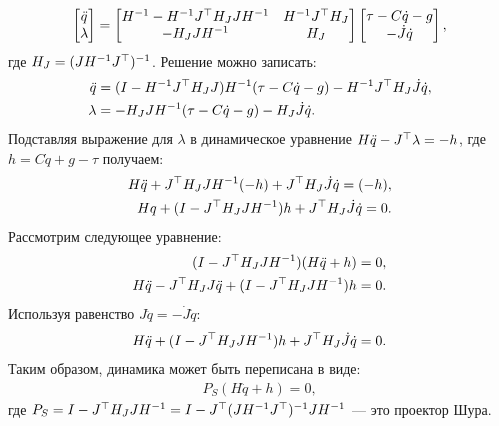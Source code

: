 \begin{equation}
	\begin{bmatrix}
		\ddot{{q}} \\
		\lambda
	\end{bmatrix}
	=
	\begin{bmatrix}
		{H}^{-1}-{H}^{-1} {J}^\top {H}_J {J} {H}^{-1} &
		{H}^{-1} {J}^\top {H}_J \\
		-{H}_J {J} {H}^{-1} & {H}_J
	\end{bmatrix}
	\begin{bmatrix}
		\tau - {C} \dot{{q}} - {g} \\
		-\dot{{J}} \dot{{q}}
	\end{bmatrix},
\end{equation}
%
где ${H}_J = ( {J} {H}^{-1} {J}^\top )^{-1}$.
%
Решение можно записать:
%
\begin{align}
	\ddot{{q}}
	&=
	({I}-{H}^{-1} {J}^\top {H}_J {J} ) {H}^{-1}(\tau - {C} \dot{{q}} - {g}) 
	-
	{H}^{-1} {J}^\top {H}_J \dot{{J}} \dot{{q}},
	\\
	\lambda
	&=
	-{H}_J {J} {H}^{-1} (\tau - {C} \dot{{q}} - {g})
	-
	{H}_J \dot{{J}} \dot{{q}}.
\end{align}
%
Подставляя выражение для $\lambda$ в динамическое уравнение ${H}\ddot{{q}} - {J}^\top\lambda
=
-{h}$, где ${h} = {C} \dot{{q}} + {g} - \tau$ получаем:
\begin{align}
	{H}\ddot{{q}} + 
	{J}^\top{H}_J {J} {H}^{-1} (-{h}) +
	{J}^\top {H}_J \dot{{J}} \dot{{q}}
	=
	(-{h}),
	\\
	{{H}{{q}} + 
		({I}-
		{J}^\top{H}_J {J} {H}^{-1}) {h} +
		{J}^\top {H}_J \dot{{J}} \dot{{q}}
		=
		0}.
\end{align}
%
Рассмотрим следующее уравнение:
%
\begin{align}
	({I}-
	{J}^\top{H}_J {J} {H}^{-1})({H}\ddot{{q}}+{h})=0,
	\\
	{H}\ddot{{q}} - {J}^\top{H}_J {J} \ddot{{q}}
	+
	({I}-
	{J}^\top{H}_J {J} {H}^{-1}){h} = 0.
\end{align}
%
Используя равенство ${J} \ddot{{q}} = -\dot{{J}} \dot{{q}}$:
%
\begin{align}{
		{H}\ddot{{q}} + ({I}-{J}^\top{H}_J {J} {H}^{-1}){h} + {J}^\top{H}_J \dot{{J}} \dot{{q}} = 0}.
\end{align}
%
Таким образом, динамика может быть переписана в виде: 
%
\begin{align}
	{P}_S({H}\ddot{{q}}+{h})=0,
\end{align}
%
где ${P}_S = {I}-{J}^\top{H}_J {J} {H}^{-1} = 
{I}-{J}^\top ( {J} {H}^{-1} {J}^\top )^{-1} {J} {H}^{-1}$ --- это проектор Шура.

